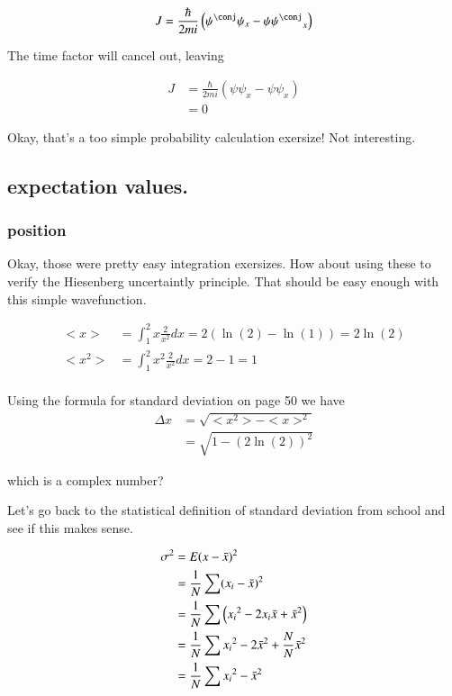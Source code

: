 \documentclass{article}
\begin{document}
\begin{align*}
J 
&= \frac{\hbar}{2mi}\left(\psi^\conj\psi_x - \psi {\psi^\conj}_x \right) \\
\end{align*}

The time factor will cancel out, leaving 

\begin{align*}
J 
&= \frac{\hbar}{2mi}\left(\psi\psi_x - \psi {\psi}_x \right) \\
&= 0
\end{align*}

Okay, that's a too simple probability calculation exersize!  Not interesting.

\subsection{ expectation values. }

\subsubsection{ position }
Okay, those were pretty easy integration exersizes.  How about using these
to verify the Hiesenberg uncertaintly principle.  That should be easy 
enough with this simple wavefunction.

\begin{align*}
<x> &= \int_1^2 x \frac{2}{x^2} dx = 2 (\ln(2) - \ln(1)) = 2 \ln(2) \\
<x^2> &= \int_1^2 x^2 \frac{2}{x^2} dx = 2 - 1 = 1 \\
\end{align*}

Using the formula for standard deviation on page 50 we have
\begin{align*}
\Delta x &= \sqrt{<x^2> - <x>^2} \\
&= \sqrt{1 - (2 \ln(2))^2}
\end{align*}

which is a complex number?

Let's go back to the statistical definition of standard deviation from school and see if this makes sense.

\begin{align*}
\sigma^2 
&= E( x - \bar{x} )^2 \\
&= \frac{1}{N} \sum (x_i - \bar{x})^2 \\
&= \frac{1}{N} \sum \left({x_i}^2 - 2 x_i \bar{x} + {\bar{x}}^2\right) \\
&= \frac{1}{N} \sum {x_i}^2 - 2 {\bar{x}}^2 + \frac{N}{N} {\bar{x}}^2 \\
&= \frac{1}{N} \sum {x_i}^2 - {\bar{x}}^2 \\
\end{align*}
\end{document}
